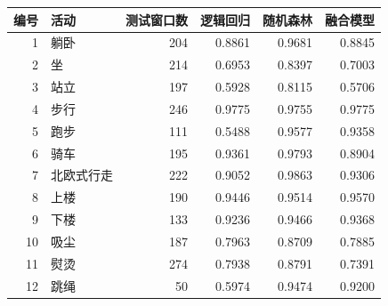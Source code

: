 \begin{tabular}{rlrrrr}
\toprule
编号 & 活动 & 测试窗口数 & 逻辑回归 & 随机森林 & 融合模型 \\
\midrule
1 & 躺卧 & 204 & 0.8861 & 0.9681 & 0.8845 \\
2 & 坐 & 214 & 0.6953 & 0.8397 & 0.7003 \\
3 & 站立 & 197 & 0.5928 & 0.8115 & 0.5706 \\
4 & 步行 & 246 & 0.9775 & 0.9755 & 0.9775 \\
5 & 跑步 & 111 & 0.5488 & 0.9577 & 0.9358 \\
6 & 骑车 & 195 & 0.9361 & 0.9793 & 0.8904 \\
7 & 北欧式行走 & 222 & 0.9052 & 0.9863 & 0.9306 \\
8 & 上楼 & 190 & 0.9446 & 0.9514 & 0.9570 \\
9 & 下楼 & 133 & 0.9236 & 0.9466 & 0.9368 \\
10 & 吸尘 & 187 & 0.7963 & 0.8709 & 0.7885 \\
11 & 熨烫 & 274 & 0.7938 & 0.8791 & 0.7391 \\
12 & 跳绳 & 50 & 0.5974 & 0.9474 & 0.9200 \\
\bottomrule
\end{tabular}
